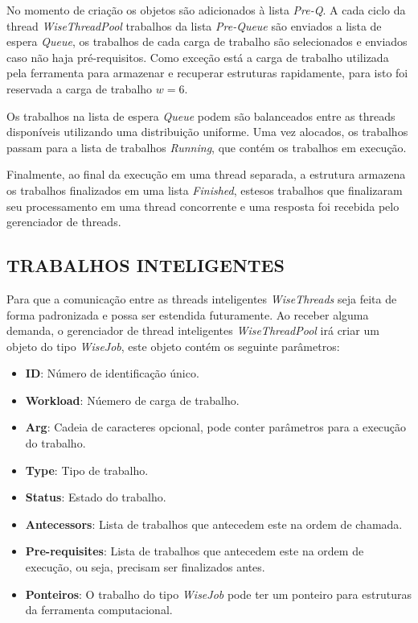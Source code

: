 \documentclass[a4paper,12pt]{monografia}
\theoremstyle{plain}
\theoremstyle{definition}
\theoremstyle{remark}
\begin{document}
No momento de criação os objetos são adicionados à lista \textit{Pre-Q}. A cada ciclo da thread \textit{WiseThreadPool} trabalhos da lista \textit{Pre-Queue} são enviados a lista de espera \textit{Queue}, os trabalhos de cada carga de trabalho são selecionados e enviados caso não haja pré-requisitos. Como exceção está a carga de trabalho utilizada pela ferramenta para armazenar e recuperar estruturas rapidamente, para isto foi reservada a carga de trabalho $w = 6$.
 
Os trabalhos na lista de espera \textit{Queue} podem são balanceados entre as threads disponíveis utilizando uma distribuição uniforme. Uma vez alocados, os trabalhos passam para a lista de trabalhos \textit{Running}, que contém os trabalhos em execução.
 
Finalmente, ao final da execução em uma thread separada, a estrutura armazena os trabalhos finalizados em uma lista \textit{Finished}, estesos trabalhos que finalizaram seu processamento em uma thread concorrente e uma resposta foi recebida pelo gerenciador de threads.

\subsection{TRABALHOS INTELIGENTES}\label{sec:trabalhos}

Para que a comunicação entre as threads inteligentes \textit{WiseThreads} seja feita de forma padronizada e possa ser estendida futuramente. Ao receber alguma demanda, o gerenciador de thread inteligentes \textit{WiseThreadPool} irá criar um objeto do tipo \textit{WiseJob}, este objeto contém os seguinte parâmetros:

\begin{itemize}
	\item \textbf{ID}: Número de identificação único.
	\item \textbf{Workload}: Núemero de carga de trabalho.
	\item \textbf{Arg}: Cadeia de caracteres opcional, pode conter parâmetros para a execução do trabalho.
	\item \textbf{Type}: Tipo de trabalho.
	\item \textbf{Status}: Estado do trabalho.
	\item \textbf{Antecessors}: Lista de trabalhos que antecedem este na ordem de chamada.
	\item \textbf{Pre-requisites}: Lista de trabalhos que antecedem este na ordem de execução, ou seja, precisam ser finalizados antes.
	\item \textbf{Ponteiros}: O trabalho do tipo \textit{WiseJob} pode ter um ponteiro para estruturas da ferramenta computacional.
\end{itemize}
\end{document}
